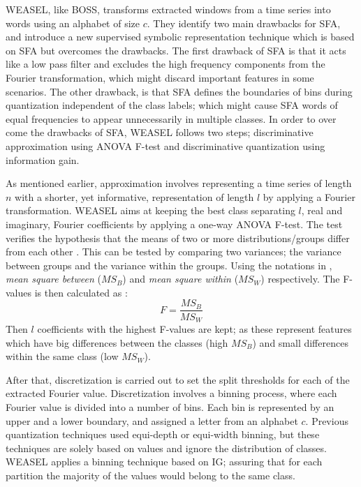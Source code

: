 WEASEL, like BOSS, transforms extracted windows from a time series into words using an alphabet of size $c$.
They identify two main drawbacks for SFA, and introduce a new supervised symbolic representation technique which is based on SFA but overcomes the drawbacks.
The first drawback of SFA is that it acts like a low pass filter and excludes the high frequency components from the Fourier transformation,
which might discard important features in some scenarios. The other drawback, is that SFA defines the boundaries of bins during quantization
independent of the class labels; which might cause SFA words of equal frequencies to appear unnecessarily in multiple classes.
In order to over come the drawbacks of SFA, WEASEL follows two steps;
discriminative approximation using ANOVA F-test and discriminative quantization using information gain.

As mentioned earlier, approximation involves representing a time series of length $n$ with a shorter, yet informative, representation of length $l$ by applying a Fourier transformation.
WEASEL aims at keeping the best class separating $l$, real and imaginary, Fourier coefficients by applying a one-way ANOVA F-test.
The test verifies the hypothesis that the means of two or more distributions/groups differ from each other \cite{lowry2014concepts}.
This can be tested by comparing two variances; the variance between groups and the variance within the groups.
Using the notations in \cite{schafer2017fast}, \emph{mean square between} ($MS_{B}$) and \emph{mean square within} ($MS_{W}$) respectively.
The F-values is then calculated as :
\begin{equation}
    F= \frac{MS_{B}}{MS_{W}}
\end{equation}
Then $l$ coefficients with the highest F-values are kept; as these represent features which have big differences between the classes (high $MS_{B}$) and
small differences within the same class (low $MS_{W}$).

After that, discretization is carried out to set the split thresholds for each of the extracted Fourier value.
Discretization involves a binning process, where each Fourier value is divided into a number of bins.
Each bin is represented by an upper and a lower boundary, and assigned a letter from an alphabet $c$.
Previous quantization techniques used equi-depth or equi-width binning, but these techniques are solely based on values and ignore the distribution of classes.
WEASEL applies a binning technique based on IG; assuring that for each partition the majority of the values would belong to the same class.

